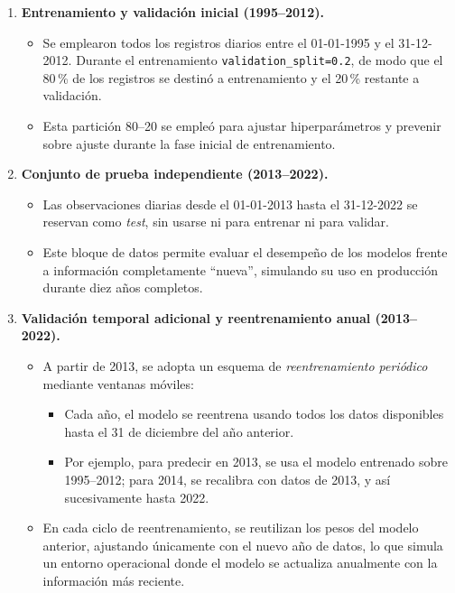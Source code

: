 \begin{enumerate}
  \item \textbf{Entrenamiento y validación inicial (1995–2012).}  
    \begin{itemize}
      \item Se emplearon todos los registros diarios entre el 01-01-1995 y el 31-12-2012. Durante el entrenamiento \texttt{validation\_split=0.2}, de modo que el 80\,\% de los registros se destinó a entrenamiento y el 20\,\% restante a validación.
      \item Esta partición 80–20 se empleó para ajustar hiperparámetros y prevenir sobre ajuste durante la fase inicial de entrenamiento.
    \end{itemize}


  \item \textbf{Conjunto de prueba independiente (2013–2022).}  
    \begin{itemize}
      \item Las observaciones diarias desde el 01-01-2013 hasta el 31-12-2022 se reservan como \emph{test}, sin usarse ni para entrenar ni para validar.  
      \item Este bloque de datos permite evaluar el desempeño de los modelos frente a información completamente “nueva”, simulando su uso en producción durante diez años completos.
    \end{itemize}

  \item \textbf{Validación temporal adicional y reentrenamiento anual (2013–2022).}  
    \begin{itemize}
      \item A partir de 2013, se adopta un esquema de \emph{reentrenamiento periódico} mediante ventanas móviles:
        \begin{itemize}
          \item Cada año, el modelo se reentrena usando todos los datos disponibles hasta el 31 de diciembre del año anterior.  
          \item Por ejemplo, para predecir en 2013, se usa el modelo entrenado sobre 1995–2012; para 2014, se recalibra con datos de 2013, y así sucesivamente hasta 2022.  
        \end{itemize}
      \item En cada ciclo de reentrenamiento, se reutilizan los pesos del modelo anterior, ajustando únicamente con el nuevo año de datos, lo que simula un entorno operacional donde el modelo se actualiza anualmente con la información más reciente.
    \end{itemize}
\end{enumerate}


